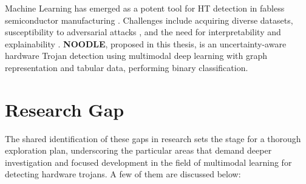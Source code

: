 Machine Learning has emerged as a potent tool for HT detection in fabless semiconductor manufacturing \cite{gubbi2023hardware, huang2020survey, liakos2019machine, koblah2023survey, koylu2023survey}. Challenges include acquiring diverse datasets, susceptibility to adversarial attacks \cite{west2023towards}, and the need for interpretability and explainability \cite{li2022interpretable, caruana2020intelligible}. \textbf{NOODLE}, proposed in this thesis, is an uncertainty-aware hardware Trojan detection using multimodal deep learning with graph representation and tabular data, performing binary classification.

\section*{Research Gap}

The shared identification of these gaps in research sets the stage for a thorough exploration plan, underscoring the particular areas that demand deeper investigation and focused development in the field of multimodal learning for detecting hardware trojans. A few of them are discussed below:

